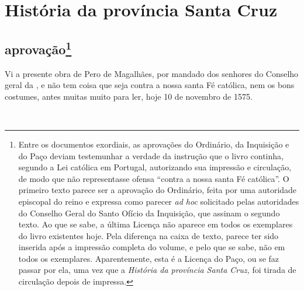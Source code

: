 

\chapter*{História da província Santa Cruz}




\section*{aprovação\protect\footnote[*]{ \MakeUppercase{E}ntre os documentos exordiais, as aprovações do
\MakeUppercase{O}rdinário, da \MakeUppercase{I}nquisição e do \MakeUppercase{P}aço deviam testemunhar a verdade da
instrução que o livro continha, segundo a Lei católica em \MakeUppercase{P}ortugal, 
autorizando sua impressão e circulação, de modo que não representasse
ofensa ``contra a nossa santa \MakeUppercase{F}é católica''.
\MakeUppercase{O} primeiro texto parece ser a aprovação do \MakeUppercase{O}rdinário, feita por uma
autoridade episcopal do reino e expressa como parecer \textit{ad hoc}
solicitado pelas autoridades do \MakeUppercase{C}onselho \MakeUppercase{G}eral do \MakeUppercase{S}anto \MakeUppercase{O}fício da
\MakeUppercase{I}nquisição, que assinam o segundo texto. \MakeUppercase{A}o que se sabe, a última
\MakeUppercase{L}icença não aparece em todos os exemplares do livro existentes hoje.
\MakeUppercase{P}ela diferença na caixa de texto, parece ter sido inserida após a
impressão completa do volume, e pelo que se sabe, não em todos os
exemplares. \MakeUppercase{A}parentemente, esta é a \MakeUppercase{L}icença do \MakeUppercase{P}aço, ou se faz passar
por ela, uma vez que a \textit{\MakeUppercase{H}istória da província \MakeUppercase{S}anta \MakeUppercase{C}ruz,} foi
tirada de circulação depois de impressa.}}

Vi a presente obra de Pero de Magalhães, por mandado dos senhores do		%
Conselho geral da , e não tem coisa que seja contra a nossa
santa Fé católica, nem os bons costumes, antes muitas muito para ler,
hoje 10 de novembro de 1575.

\begin{flushright}
\noindent\textit{}\\  
\end{flushright}

